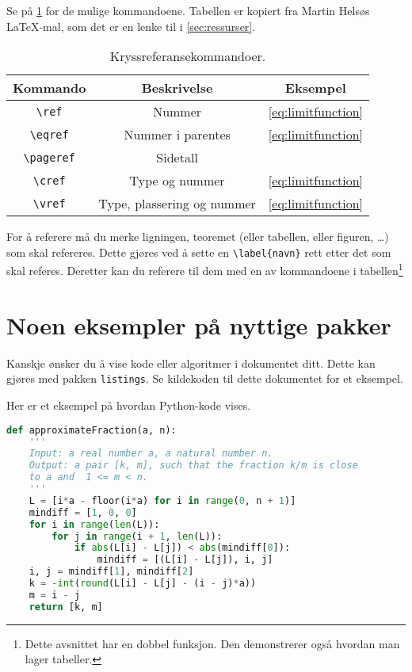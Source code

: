 \documentclass[a4paper, norsk]{article}  %
\begin{document}
Se på \cref{tab:kryssreferanser} for de mulige kommandoene. Tabellen er kopiert fra Martin Helsøs \LaTeX-mal, som det er en lenke til i \vref{sec:ressurser}.

\begin{table}
\centering
\begin{tabular}{ccc}
\hline
    Kommando & Beskrivelse & Eksempel \\
\hline
    \texttt{\textbackslash ref}     & Nummer            & \ref{eq:limitfunction}        \\
    \texttt{\textbackslash eqref}   & Nummer i parentes & \eqref{eq:limitfunction}      \\
    \texttt{\textbackslash pageref} & Sidetall          & \pageref{eq:limitfunction}    \\
    \texttt{\textbackslash cref}    & Type og nummer    & \cref{eq:limitfunction}       \\
    \texttt{\textbackslash vref} & Type, plassering og nummer & \vref{eq:limitfunction} \\
\hline
\end{tabular}
\caption{Kryssreferansekommandoer.}
\label{tab:kryssreferanser}
\end{table}

For å referere må du merke ligningen, teoremet (eller tabellen, eller figuren, \dots) som skal refereres. Dette gjøres ved å sette en \verb|\label{navn}| rett etter det som skal referes. Deretter kan du referere til dem med en av kommandoene i tabellen\footnote{Dette avsnittet har en dobbel funksjon. Den demonstrerer også hvordan man lager tabeller.}

\section{Noen eksempler på nyttige pakker}
\label{sec:pakker}

Kanskje ønsker du å vise kode eller algoritmer i dokumentet ditt. Dette kan gjøres med pakken \texttt{listings}. Se kildekoden til dette dokumentet for et eksempel. 

Her er et eksempel på hvordan Python-kode vises.

\begin{lstlisting}[language = Python]
def approximateFraction(a, n):
	'''
	Input: a real number a, a natural number n.
	Output: a pair [k, m], such that the fraction k/m is close 
	to a and  1 <= m < n.
	'''
	L = [i*a - floor(i*a) for i in range(0, n + 1)]
	mindiff = [1, 0, 0]
	for i in range(len(L)):
		for j in range(i + 1, len(L)):
			if abs(L[i] - L[j]) < abs(mindiff[0]):
				mindiff = [(L[i] - L[j]), i, j]
	i, j = mindiff[1], mindiff[2]
	k = -int(round(L[i] - L[j] - (i - j)*a))
	m = i - j
	return [k, m]
\end{lstlisting}
\end{document}
